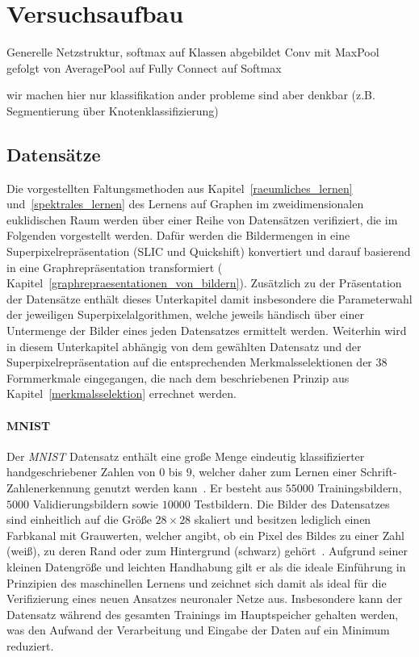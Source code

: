 \section{Versuchsaufbau}
\label{versuchsaufbau}

Generelle Netzstruktur, softmax auf Klassen abgebildet
Conv mit MaxPool gefolgt von AveragePool auf Fully Connect auf Softmax

wir machen hier nur klassifikation
ander probleme sind aber denkbar (z.B. Segmentierung über Knotenklassifizierung)

\subsection{Datensätze}
\label{datensaetze}

Die vorgestellten Faltungsmethoden aus Kapitel~\ref{raeumliches_lernen} und~\ref{spektrales_lernen} \bzgl{} des Lernens auf Graphen im zweidimensionalen euklidischen Raum werden über einer Reihe von Datensätzen verifiziert, die im Folgenden vorgestellt werden.
Dafür werden die Bildermengen in eine Superpixelrepräsentation (\gls{SLIC} und Quickshift) konvertiert und darauf basierend in eine Graphrepräsentation transformiert (\vgl{} Kapitel~\ref{graphrepraesentationen_von_bildern}).
Zusätzlich zu der Präsentation der Datensätze enthält dieses Unterkapitel damit insbesondere die Parameterwahl der jeweiligen Superpixelalgorithmen, welche jeweils händisch über einer Untermenge der Bilder eines jeden Datensatzes ermittelt werden.
Weiterhin wird in diesem Unterkapitel abhängig von dem gewählten Datensatz und der Superpixelrepräsentation auf die entsprechenden Merkmalsselektionen der $38$ Formmerkmale eingegangen, die nach dem beschriebenen Prinzip aus Kapitel~\ref{merkmalsselektion} errechnet werden.

\paragraph{MNIST}
\label{mnist}

Der \emph{\gls{MNIST}} Datensatz enthält eine große Menge eindeutig klassifizierter handgeschriebener Zahlen von $0$ bis $9$, welcher daher zum Lernen einer Schrift- \bzw{} Zahlenerkennung genutzt werden kann~\cite{mnist}.
Er besteht aus $55000$ Trainingsbildern, $5000$ Validierungsbildern sowie $10000$ Testbildern.
Die Bilder des Datensatzes sind einheitlich auf die Größe $28 \times 28$ skaliert und besitzen lediglich einen Farbkanal mit Grauwerten, welcher angibt, ob ein Pixel des Bildes zu einer Zahl (weiß), zu deren Rand oder zum Hintergrund (schwarz) gehört~\cite{mnist}.
Aufgrund seiner kleinen Datengröße und leichten Handhabung gilt er als die ideale Einführung in Prinzipien des maschinellen Lernens und zeichnet sich damit als ideal für die Verifizierung eines neuen Ansatzes \bzgl{} neuronaler Netze aus.
Insbesondere kann der Datensatz während des gesamten Trainings im Hauptspeicher gehalten werden, was den Aufwand \bzgl{} der Verarbeitung und Eingabe der Daten auf ein Minimum reduziert.

